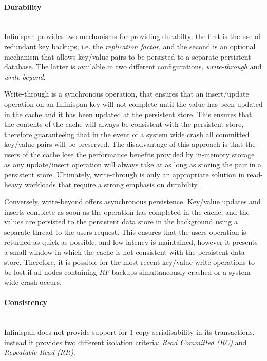 		    \paragraph{Durability} \hspace{0pt} \\
		    Infinispan provides two mechanisms for providing durabilty: the first is the use of redundant key backups, i.e. the \emph{replication factor}, and the second is an optional mechanism that allows key/value pairs to be persisted to a separate persistent database.  The latter is available in two different configurations, \emph{write-through} and \emph{write-beyond}. 
		    
		    Write-through is a synchronous operation, that ensures that an insert/update operation on an Infinispan key will not complete until the value has been updated in the cache and it has been updated at the persistent store.  This ensures that the contents of the cache will always be consistent with the persistent store, therefore guaranteeing that in the event of a system wide crash all committed key/value pairs will be preserved.  The disadvantage of this approach is that the users of the cache lose the performance benefits provided by in-memory storage as any update/insert operation will always take at as long as storing the pair in a persistent store.  Ultimately, write-through is only an appropriate solution in read-heavy workloads that require a strong emphasis on durability.  
		    
		    Conversely, write-beyond offers asynchronous persistence.  Key/value updates and inserts complete as soon as the operation has completed in the cache, and the values are persisted to the persistent data store in the background using a separate thread to the users request.  This ensures that the users operation is returned as quick as possible, and low-latency is maintained, however it presents a small window in which the cache is not consistent with the persistent data store.  Therefore, it is possible for the most recent key/value write operations to be lost if all nodes containing $RF$ backups simultaneously crashed or a system wide crash occurs.  
    
	        \paragraph{Consistency} \hspace{0pt} \\ \label{consistency}
	        Infinispan does not provide support for 1-copy serialisability in its transactions, instead it provides two different isolation criteria: \emph{Read Committed (RC)} and \emph{Repeatable Read (RR)}.  
	        
